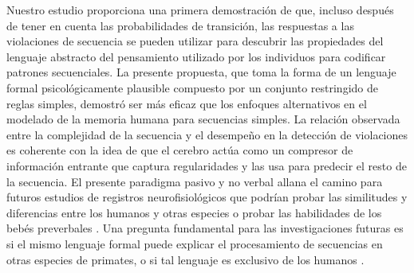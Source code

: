 
Nuestro estudio proporciona una primera demostración de que, incluso después de tener en cuenta las probabilidades de transición, las respuestas a las violaciones de secuencia se pueden utilizar para descubrir las propiedades del lenguaje abstracto del pensamiento utilizado por los individuos para codificar patrones secuenciales. La presente propuesta, que toma la forma de un lenguaje formal psicológicamente plausible compuesto por un conjunto restringido de reglas simples, demostró ser más eficaz que los enfoques alternativos en el modelado de la memoria humana para secuencias simples. La relación observada entre la complejidad de la secuencia y el desempeño en la detección de violaciones es coherente con la idea de que el cerebro actúa como un compresor de información entrante que captura regularidades y las usa para predecir el resto de la secuencia. El presente paradigma pasivo y no verbal allana el camino para futuros estudios de registros neurofisiológicos que podrían probar las similitudes y diferencias entre los humanos y otras especies \cite{f13} o probar las habilidades de los bebés preverbales \cite{f70}. Una pregunta fundamental para las investigaciones futuras es si el mismo lenguaje formal puede explicar el procesamiento de secuencias en otras especies de primates, o si tal lenguaje es exclusivo de los humanos \cite{f6}.

